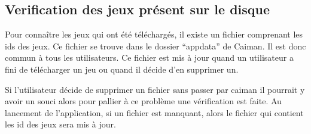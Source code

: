 \documentclass[a4paper,12pt,french]{sphinxmanual}
\begin{document}
\subsection{Verification des jeux présent sur le disque}
\label{\detokenize{organique:verification-des-jeux-present-sur-le-disque}}
\sphinxAtStartPar
Pour connaître les jeux qui ont été téléchargés, il existe un fichier comprenant les ids des jeux. Ce fichier se trouve dans le dossier “appdata” de Caiman. Il est donc commun à tous les utilisateurs. Ce fichier est mis à jour quand un utilisateur a fini de télécharger un jeu ou quand il décide d’en supprimer un.

\begin{sphinxVerbatim}[commandchars=\\\{\}]
  
               

                
                   
                       
                           

\end{sphinxVerbatim}

\sphinxAtStartPar
Si l’utilisateur décide de supprimer un fichier sans passer par caiman il pourrait y avoir un souci alors pour pallier à ce problème une vérification est faite. Au lancement de l’application, si un fichier est manquant, alors le fichier qui contient les id des jeux sera mis à jour.
\end{document}
